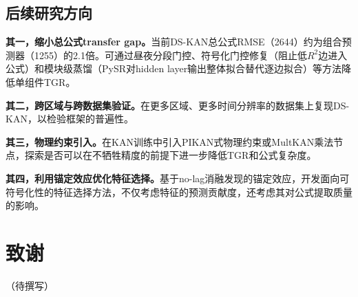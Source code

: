 \documentclass[12pt,a4paper,oneside]{ctexbook}
\begin{document}
\section{后续研究方向}

\textbf{其一，缩小总公式transfer gap。}当前DS-KAN总公式RMSE（2644）约为组合预测器（1255）的2.1倍。可通过昼夜分段门控、符号化门控修复（阻止低$R^2$边进入公式）和模块级蒸馏（PySR对hidden layer输出整体拟合替代逐边拟合）等方法降低单组件TGR。

\textbf{其二，跨区域与跨数据集验证。}在更多区域、更多时间分辨率的数据集上复现DS-KAN，以检验框架的普遍性。

\textbf{其三，物理约束引入。}在KAN训练中引入PIKAN式物理约束或MultKAN乘法节点，探索是否可以在不牺牲精度的前提下进一步降低TGR和公式复杂度。

\textbf{其四，利用锚定效应优化特征选择。}基于no-lag消融发现的锚定效应，开发面向可符号化性的特征选择方法，不仅考虑特征的预测贡献度，还考虑其对公式提取质量的影响。

\printbibliography[heading=bibintoc,title={参考文献}]

\backmatter
\chapter*{致谢}

（待撰写）
\end{document}
